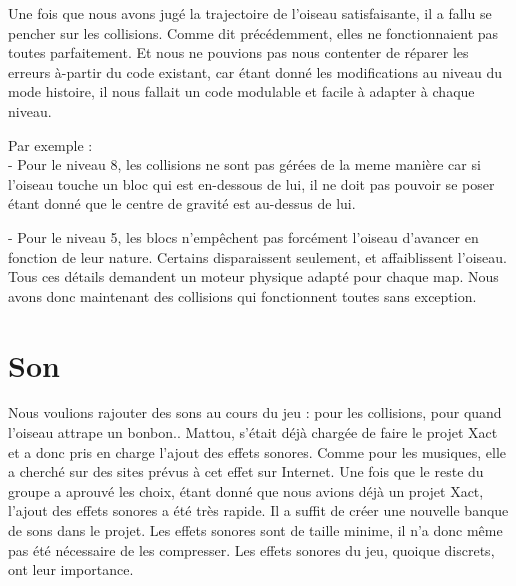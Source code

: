 \documentclass [11pt]{report}
\begin{document}
		
		\vspace{8mm}
		
		
		
		\indent Une fois que nous avons jugé la trajectoire de l'oiseau satisfaisante, il a fallu se pencher sur les collisions. Comme dit précédemment, elles ne fonctionnaient pas toutes parfaitement. Et nous ne pouvions pas nous contenter de réparer les erreurs à-partir du code existant, car étant donné les modifications au niveau du mode histoire, il nous fallait un code modulable et facile à adapter à chaque niveau.\\
		
		\newpage
		
		\noindent Par exemple :\\
		\indent\indent - Pour le niveau 8, les collisions ne sont pas gérées de la meme manière car si l'oiseau touche un bloc qui est en-dessous de lui, il ne doit pas pouvoir se poser étant donné que le centre de gravité est au-dessus de lui.
		
		\indent\indent - Pour le niveau 5, les blocs n'empêchent pas forcément l'oiseau d'avancer en fonction de leur nature. Certains disparaissent seulement, et affaiblissent l'oiseau.\\
		
		
		Tous ces détails demandent un moteur physique adapté pour chaque map. Nous avons donc maintenant des collisions qui fonctionnent toutes sans exception.
		
		\vspace{10mm}
		
	
	\section{Son}
		\indent Nous voulions rajouter des sons au cours du jeu : pour les collisions, pour quand l'oiseau attrape un bonbon.. Mattou, s'était déjà chargée de faire le projet Xact et a donc pris en charge l'ajout des effets sonores. Comme pour les musiques, elle a cherché sur des sites prévus à cet effet sur Internet. Une fois que le reste du groupe a aprouvé les choix, étant donné que nous avions déjà un projet Xact, l'ajout des effets sonores  a été très rapide. Il a suffit de créer une nouvelle banque de sons dans le projet. Les effets sonores sont de taille minime, il n'a donc m\^eme pas été nécessaire de les compresser. Les effets sonores du jeu, quoique discrets, ont leur importance.

		\vspace{10mm}
\end{document}
